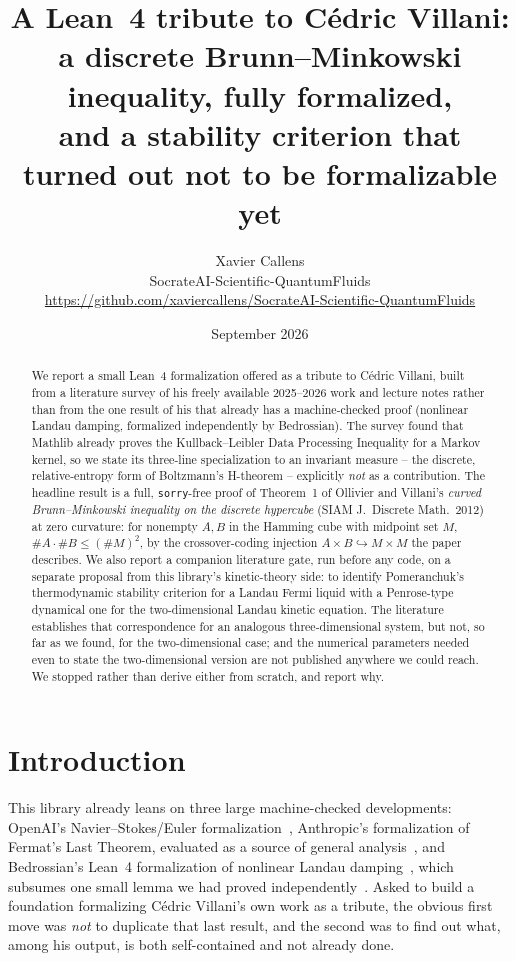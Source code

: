 \documentclass[11pt,a4paper]{article}
\title{\textbf{A Lean~4 tribute to Cédric Villani:}\\
\large a discrete Brunn--Minkowski inequality, fully formalized,\\
and a stability criterion that turned out not to be formalizable yet}
\author{Xavier Callens\\
\small SocrateAI-Scientific-QuantumFluids\\
\small \url{https://github.com/xaviercallens/SocrateAI-Scientific-QuantumFluids}}
\date{September 2026}
\newcommand{\lean}[1]{\texttt{\small #1}}
\begin{document}
\maketitle

\begin{abstract}
\noindent
We report a small Lean~4 formalization offered as a tribute to Cédric Villani, built from a literature
survey of his freely available 2025--2026 work and lecture notes rather than from the one result of his
that already has a machine-checked proof (nonlinear Landau damping, formalized independently by
Bedrossian). The survey found that Mathlib already proves the Kullback--Leibler Data Processing
Inequality for a Markov kernel, so we state its three-line specialization to an invariant measure --
the discrete, relative-entropy form of Boltzmann's H-theorem -- explicitly \emph{not} as a
contribution. The headline result is a full, \lean{sorry}-free proof of Theorem~1 of
Ollivier and Villani's \emph{curved Brunn--Minkowski inequality on the discrete hypercube}
(SIAM J.\ Discrete Math.\ 2012) at zero curvature: for nonempty $A,B$ in the Hamming cube with midpoint
set $M$, $\#A\cdot\#B\le(\#M)^2$, by the crossover-coding injection $A\times B\hookrightarrow M\times M$
the paper describes. We also report a companion literature gate, run before any code, on a separate proposal from this
library's kinetic-theory side: to identify Pomeranchuk's thermodynamic stability criterion for a Landau
Fermi liquid with a Penrose-type dynamical one for the two-dimensional Landau kinetic equation. The
literature establishes that correspondence for an analogous three-dimensional system, but not, so far as
we found, for the two-dimensional case; and the numerical parameters needed even to state the
two-dimensional version are not published anywhere we could reach. We stopped rather than derive either
from scratch, and report why.
\end{abstract}

\section{Introduction}

This library already leans on three large machine-checked developments: OpenAI's Navier--Stokes/Euler
formalization~\cite{OpenAINSE}, Anthropic's formalization of Fermat's Last Theorem, evaluated as a
source of general analysis~\cite{AnthropicFLT}, and Bedrossian's Lean~4 formalization of nonlinear
Landau damping~\cite{Bedrossian2026}, which subsumes one small lemma we had proved
independently~\cite{CallensKinetic}. Asked to build a foundation formalizing Cédric Villani's own work
as a tribute, the obvious first move was \emph{not} to duplicate that last result, and the second was to
find out what, among his output, is both self-contained and not already done.
\end{document}
